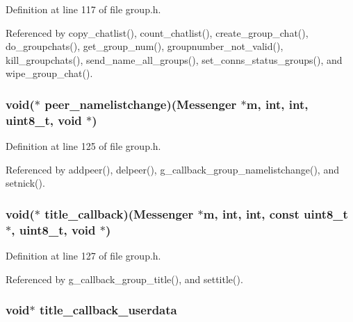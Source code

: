 Definition at line 117 of file group.\+h.



Referenced by copy\+\_\+chatlist(), count\+\_\+chatlist(), create\+\_\+group\+\_\+chat(), do\+\_\+groupchats(), get\+\_\+group\+\_\+num(), groupnumber\+\_\+not\+\_\+valid(), kill\+\_\+groupchats(), send\+\_\+name\+\_\+all\+\_\+groups(), set\+\_\+conns\+\_\+status\+\_\+groups(), and wipe\+\_\+group\+\_\+chat().

\hypertarget{struct_group___chats_a3f11f69cf6d4e6d1ed57b5306b097baf}{
\subsubsection[{peer\+\_\+namelistchange}]{\setlength{\rightskip}{0pt plus 5cm}void($\ast$ peer\+\_\+namelistchange)({\bf Messenger} $\ast${\bf m}, int, int, uint8\+\_\+t, void $\ast$)}}\label{struct_group___chats_a3f11f69cf6d4e6d1ed57b5306b097baf}


Definition at line 125 of file group.\+h.



Referenced by addpeer(), delpeer(), g\+\_\+callback\+\_\+group\+\_\+namelistchange(), and setnick().

\hypertarget{struct_group___chats_a3a2940882c161941fd7f3274064bd594}{
\subsubsection[{title\+\_\+callback}]{\setlength{\rightskip}{0pt plus 5cm}void($\ast$ title\+\_\+callback)({\bf Messenger} $\ast${\bf m}, int, int, const uint8\+\_\+t $\ast$, uint8\+\_\+t, void $\ast$)}}\label{struct_group___chats_a3a2940882c161941fd7f3274064bd594}


Definition at line 127 of file group.\+h.



Referenced by g\+\_\+callback\+\_\+group\+\_\+title(), and settitle().

\hypertarget{struct_group___chats_a75c386ae84b59f8f38e02cd0f841ba8b}{
\subsubsection[{title\+\_\+callback\+\_\+userdata}]{\setlength{\rightskip}{0pt plus 5cm}void$\ast$ title\+\_\+callback\+\_\+userdata}}\label{struct_group___chats_a75c386ae84b59f8f38e02cd0f841ba8b}


